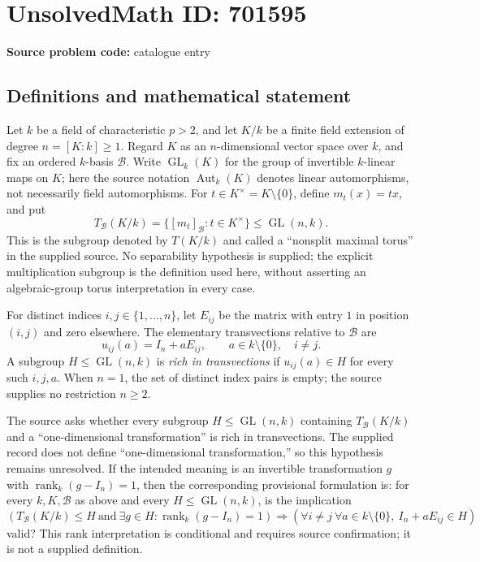 \documentclass[11pt]{article}
\begin{document}
\section*{UnsolvedMath ID: 701595}
\textbf{Source problem code:} catalogue entry
\subsection{Definitions and mathematical statement}
Let \(k\) be a field of characteristic \(p>2\), and let \(K/k\) be a finite field extension of degree \(n=[K:k]\geq 1\). Regard \(K\) as an \(n\)-dimensional vector space over \(k\), and fix an ordered \(k\)-basis \(\mathcal B\). Write \(\operatorname{GL}_k(K)\) for the group of invertible \(k\)-linear maps on \(K\); here the source notation \(\operatorname{Aut}_k(K)\) denotes linear automorphisms, not necessarily field automorphisms. For \(t\in K^{\times}=K\setminus\{0\}\), define \(m_t(x)=tx\), and put
\[
T_{\mathcal B}(K/k)=\{[m_t]_{\mathcal B}:t\in K^{\times}\}\leq\operatorname{GL}(n,k).
\]
This is the subgroup denoted by \(T(K/k)\) and called a ``nonsplit maximal torus'' in the supplied source. No separability hypothesis is supplied; the explicit multiplication subgroup is the definition used here, without asserting an algebraic-group torus interpretation in every case.

For distinct indices \(i,j\in\{1,\ldots,n\}\), let \(E_{ij}\) be the matrix with entry \(1\) in position \((i,j)\) and zero elsewhere. The elementary transvections relative to \(\mathcal B\) are
\[
u_{ij}(a)=I_n+aE_{ij},\qquad a\in k\setminus\{0\},\quad i\ne j.
\]
A subgroup \(H\leq\operatorname{GL}(n,k)\) is \emph{rich in transvections} if \(u_{ij}(a)\in H\) for every such \(i,j,a\). When \(n=1\), the set of distinct index pairs is empty; the source supplies no restriction \(n\geq2\).

The source asks whether every subgroup \(H\leq\operatorname{GL}(n,k)\) containing \(T_{\mathcal B}(K/k)\) and a ``one-dimensional transformation'' is rich in transvections. The supplied record does not define ``one-dimensional transformation,'' so this hypothesis remains unresolved. If the intended meaning is an invertible transformation \(g\) with \(\operatorname{rank}_k(g-I_n)=1\), then the corresponding provisional formulation is: for every \(k,K,\mathcal B\) as above and every \(H\leq\operatorname{GL}(n,k)\), is the implication
\[
\left(T_{\mathcal B}(K/k)\leq H\ \text{and}\ \exists g\in H:\operatorname{rank}_k(g-I_n)=1\right)
\Longrightarrow
\left(\forall i\ne j\ \forall a\in k\setminus\{0\},\ I_n+aE_{ij}\in H\right)
\]
valid? This rank interpretation is conditional and requires source confirmation; it is not a supplied definition.
\end{document}
